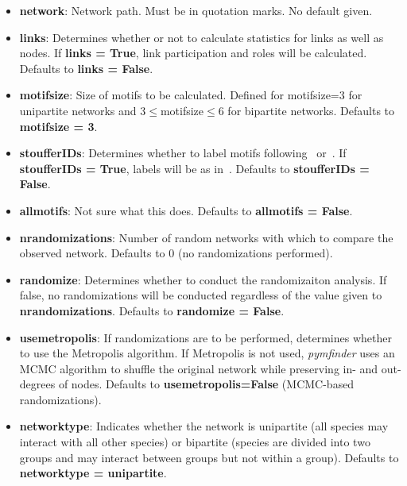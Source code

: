 \documentclass[12pt]{article}
\begin{document}
     	\begin{itemize}

     		\item \textbf{network}: Network path. Must be in quotation marks. No default given.

				\item \textbf{links}: Determines whether or not to calculate statistics for links as well as nodes. If \textbf{links = True}, link participation and roles will be calculated. Defaults to \textbf{links = False}.

				\item \textbf{motifsize}: Size of motifs to be calculated. Defined for motifsize=3 for unipartite networks and 3$\leq$motifsize$\leq$6 for bipartite networks. Defaults to \textbf{motifsize = 3}.

				\item \textbf{stoufferIDs}: Determines whether to label motifs following~\citet{StoufferIDpaper} or~\citet{Numberpaper}. If \textbf{stoufferIDs = True}, labels will be as in~\citet{StoufferIDpaper}. Defaults to \textbf{stoufferIDs = False}.

				\item \textbf{allmotifs}: Not sure what this does. Defaults to \textbf{allmotifs = False}.

				\item \textbf{nrandomizations}: Number of random networks with which to compare the observed network. Defaults to 0 (no randomizations performed).

				\item \textbf{randomize}: Determines whether to conduct the randomizaiton analysis. If false, no randomizations will be conducted regardless of the value given to \textbf{nrandomizations}. Defaults to \textbf{randomize = False}.

				\item \textbf{usemetropolis}: If randomizations are to be performed, determines whether to use the Metropolis algorithm. If Metropolis is not used, \emph{pymfinder} uses an MCMC algorithm to shuffle the original network while preserving in- and out-degrees of nodes. Defaults to \textbf{usemetropolis=False} (MCMC-based randomizations).

				\item \textbf{networktype}: Indicates whether the network is unipartite (all species may interact with all other species) or bipartite (species are divided into two groups and may interact between groups but not within a group). Defaults to \textbf{networktype = unipartite}.

			\end{itemize}
\end{document}
